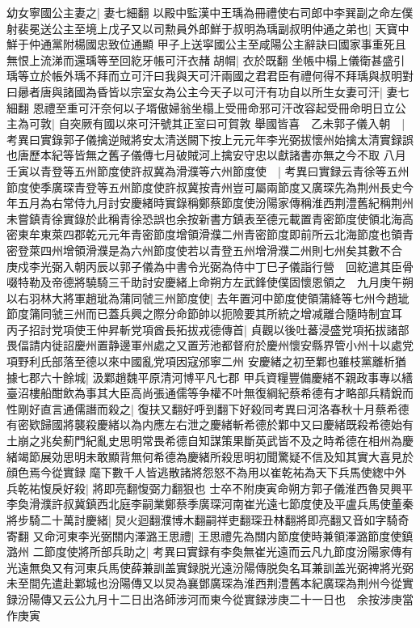 幼女寧國公主妻之|{
	妻七細翻}
以殿中監漢中王瑀為冊禮使右司郎中李巽副之命左僕射裴冕送公主至境上戊子又以司勲員外郎鮮于叔明為瑀副叔明仲通之弟也|{
	天寶中鮮于仲通黨附楊國忠致位通顯}
甲子上送寜國公主至咸陽公主辭訣曰國家事重死且無恨上流涕而還瑀等至回紇牙帳可汗衣赭胡㡌|{
	衣於既翻}
坐帳中榻上儀衛甚盛引瑀等立於帳外瑀不拜而立可汗曰我與天可汗兩國之君君臣有禮何得不拜瑀與叔明對曰曏者唐與諸國為昏皆以宗室女為公主今天子以可汗有功自以所生女妻可汗|{
	妻七細翻}
恩禮至重可汗奈何以子壻傲婦翁坐榻上受冊命邪可汗改容起受冊命明日立公主為可敦|{
	自突厥有國以來可汗號其正室曰可賀敦}
舉國皆喜　乙未郭子儀入朝　|{
	考異曰實錄郭子儀擒逆賊將安太清送闕下按上元元年李光弼拔懷州始擒太清實録誤也唐歷本紀等皆無之舊子儀傳七月破賊河上擒安守忠以獻諸書亦無之今不取}
八月壬寅以青登等五州節度使許叔冀為滑濮等六州節度使　|{
	考異曰實録云青徐等五州節度使季廣琛青登等五州節度使許叔冀按青州豈可屬兩節度又廣琛先為荆州長史今年五月為右常侍九月討安慶緒時實錄稱鄭蔡節度使汾陽家傳稱淮西荆澧舊紀稱荆州未嘗鎮青徐實錄於此稱青徐恐誤也余按新書方鎮表至德元載置青密節度使領北海高密東牟東萊四郡乾元元年青密節度增領滑濮二州青密節度即前所云北海節度也領青密登萊四州增領滑濮是為六州節度使若以青登五州增滑濮二州則七州矣其數不合}
庚戍李光弼入朝丙辰以郭子儀為中書令光弼為侍中丁巳子儀詣行營　回紇遣其臣骨啜特勒及帝德將驍騎三千助討安慶緒上命朔方左武鋒使僕固懷恩領之　九月庚午朔以右羽林大將軍趙玼為蒲同虢三州節度使|{
	去年置河中節度使領蒲絳等七州今趙玼節度䈬同虢三州而已蓋兵興之際分命節帥以扼險要其所統之增减離合隨時制宜耳}
丙子招討党項使王仲昇斬党項酋長拓拔戎德傳首|{
	貞觀以後吐蕃浸盛党項拓拔諸部畏偪請内徙詔慶州置静邊軍州處之又置芳池都督府於慶州懷安縣界管小州十以處党項野利氏部落至德以來中國亂党項因寇邠寧二州}
安慶緒之初至鄴也雖枝黨離析猶據七郡六十餘城|{
	汲鄴趙魏平原清河博平凡七郡}
甲兵資糧豐備慶緒不親政事專以繕臺沼樓船酣飲為事其大臣高尚張通儒等争權不叶無復綱紀蔡希德有才略部兵精銳而性剛好直言通儒譖而殺之|{
	復扶又翻好呼到翻下好殺同考異曰河洛春秋十月蔡希德有密欵歸國將襲殺慶緒以為内應左右泄之慶緒斬希德於鄴中又曰慶緒既殺希德始有土崩之兆矣薊門紀亂史思明常畏希德自知謀策果斷英武皆不及之時希德在相州為慶緒竭節展効思明未敢顯背無何希德為慶緒所殺思明初聞驚疑不信及知其實大喜見於顔色焉今從實録}
麾下數千人皆逃散諸將怨怒不為用以崔乾祐為天下兵馬使緫中外兵乾祐愎戾好殺|{
	將即亮翻愎弼力翻狠也}
士卒不附庚寅命朔方郭子儀淮西魯炅興平李奐滑濮許叔冀鎮西北庭李嗣業鄭蔡季廣琛河南崔光遠七節度使及平盧兵馬使董秦將步騎二十萬討慶緒|{
	炅火迴翻濮博木翻嗣祥吏翻琛丑林翻將即亮翻又音如字騎奇寄翻}
又命河東李光弼關内澤潞王思禮|{
	王思禮先為關内節度使時兼領澤潞節度使鎮潞州}
二節度使將所部兵助之|{
	考異曰實録有李奐無崔光遠而云凡九節度汾陽家傳有光遠無奐又有河東兵馬使薛兼訓盖實録脱光遠汾陽傳脱奐名耳兼訓盖光弼禆將光弼未至間先遣赴鄴城也汾陽傳又以炅為襄鄧廣琛為淮西荆澧舊本紀廣琛為荆州今從實録汾陽傳又云公九月十二日出洛師涉河而東今從實録涉庚二十一日也　余按涉庚當作庚寅}
